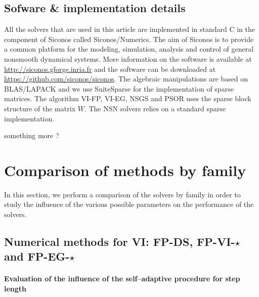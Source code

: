 \subsection{Sofware \& implementation details}

All the solvers that are used in this article are implemented in standard C in the component of Siconos called Siconos/Numerics. The aim of Siconos is to provide a common platform for the modeling, simulation, analysis and control of general nonsmooth dynamical systems. More information on the software is available at \href{http://siconos.gforge.inria.fr}{http://siconos.gforge.inria.fr} and the software can be downloaded at  \href{https://github.com/siconos/siconos}{https://github.com/siconos/siconos}. The algebraic manipulations are based on BLAS/LAPACK and we use SuiteSparse for the implementation of sparse matrices. The algorithm {\sf VI-FP}, {\sf VI-EG}, {\sf NSGS} and {\sf PSOR} uses the sparse block structure of the matrix $W$. The {\sf NSN} solvers relies on a standard sparse implementation.


\begin{ndrva}
 something more ?
\end{ndrva}





\clearpage


\section{Comparison of methods by family}

In this section, we perform a comparison of the solvers by family in order to study the influence of the various possible parameters on the performance of the solvers.

\subsection{Numerical methods for VI: {\sf FP-DS, FP-VI-$\star$} and {\sf FP-EG-$\star$}}



\def\measurename{time}
\def\performance{time}
\def\widthfigure{0.6}
\def\figwidth{0.3\textwidth}
\def\legendwidth{0.6\textwidth}

\paragraph{Evaluation of the influence of the self--adaptive procedure for step length}


